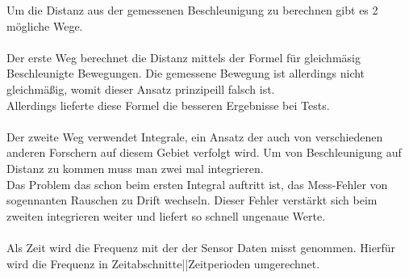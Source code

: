 Um die Distanz aus der gemessenen Beschleunigung zu berechnen
gibt es 2 mögliche Wege. \\
\\
Der erste Weg berechnet die Distanz 
mittels der Formel für gleichmäsig Beschleunigte Bewegungen.
Die gemessene Bewegung ist allerdings nicht gleichmäßig, womit
dieser Ansatz prinzipeill falsch ist.\\
Allerdings lieferte diese Formel die besseren Ergebnisse 
bei Tests.\\
\\
Der zweite Weg verwendet Integrale, ein Ansatz der auch von
verschiedenen anderen Forschern auf diesem Gebiet verfolgt wird.
Um von Beschleunigung auf Distanz zu kommen muss man zwei mal 
integrieren.\\
Das Problem das schon beim ersten Integral auftritt ist, 
das Mess-Fehler von sogennanten Rauschen zu Drift wechseln.
Dieser Fehler verstärkt sich beim zweiten integrieren weiter 
und liefert so schnell ungenaue Werte.\\
\\
Als Zeit wird die Frequenz mit der der Sensor Daten misst 
genommen. Hierfür wird die Frequenz in Zeitabschnitte||Zeitperioden
umgerechnet.